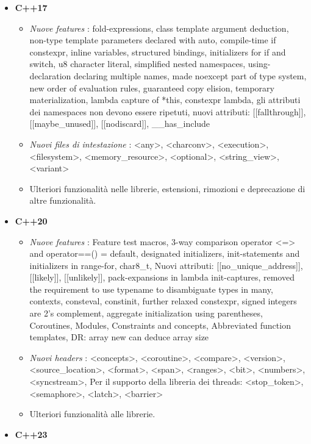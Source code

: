 \begin{itemize}
	\item \textsf{\small \textbf{C++17}}
	\begin{itemize}
		\item \textsf{\small \emph{Nuove features} : fold-expressions, class template argument deduction, non-type template parameters declared with auto, compile-time if constexpr, inline variables, structured bindings, initializers for if and switch, u8 character literal, simplified nested namespaces, using-declaration declaring multiple names, made noexcept part of type system, new order of evaluation rules, guaranteed copy elision, temporary materialization, lambda capture of *this, constexpr lambda, gli attributi dei namespaces non devono essere ripetuti, nuovi attributi: [[fallthrough]], [[maybe\_unused]], [[nodiscard]], \_\_has\_include}
		\item \textsf{\small \emph{Nuovi files di intestazione} : <any>, <charconv>, <execution>, <filesystem>, <memory\_resource>, <optional>, <string\_view>, <variant>}
		\item \textsf{\small Ulteriori funzionalità nelle librerie, estensioni, rimozioni e deprecazione di altre funzionalità.}
	\end{itemize}
	\item \textsf{\small \textbf{C++20}}
	\begin{itemize}
		\item \textsf{\small \emph{Nuove features} : Feature test macros, 3-way comparison operator <=> and operator==() = default, designated initializers, init-statements and initializers in range-for, char8\_t, Nuovi attributi: [[no\_unique\_address]], [[likely]], [[unlikely]], pack-expansions in lambda init-captures, removed the requirement to use typename to disambiguate types in many, contexts, consteval, constinit, further relaxed constexpr, signed integers are 2's complement, aggregate initialization using parentheses, Coroutines, Modules, Constraints and concepts, Abbreviated function templates, DR: array new can deduce array size}
		\item \textsf{\small \emph{Nuovi headers} : <concepts>, <coroutine>, <compare>, <version>, <source\_location>, <format>, <span>, <ranges>, <bit>, <numbers>, <syncstream>, Per il supporto della libreria dei threads: <stop\_token>, <semaphore>, <latch>, <barrier>}
		\item \textsf{\small Ulteriori funzionalità alle librerie.}
	\end{itemize}
	\item \textsf{\small \textbf{C++23}} %
\end{itemize}

